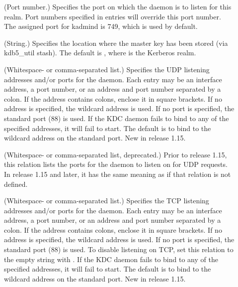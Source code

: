 \documentclass[letterpaper,10pt,english]{sphinxmanual}
\begin{document}
\begin{description}
\item[{}] \leavevmode
(Port number.)  Specifies the port on which the {\hyperref[\detokenize{admin/admin_commands/kadmind:kadmind-8}]{}}
daemon is to listen for this realm.  Port numbers specified in
 entries will override this port number.  The
assigned port for kadmind is 749, which is used by default.

\item[{}] \leavevmode
(String.)  Specifies the location where the master key has been
stored (via kdb5\_util stash).  The default is {\hyperref[\detokenize{mitK5defaults:paths}]{}}, where  is the Kerberos realm.

\item[{}] \leavevmode
(Whitespace- or comma-separated list.)  Specifies the UDP
listening addresses and/or ports for the {\hyperref[\detokenize{admin/admin_commands/krb5kdc:krb5kdc-8}]{}} daemon.
Each entry may be an interface address, a port number, or an
address and port number separated by a colon.  If the address
contains colons, enclose it in square brackets.  If no address is
specified, the wildcard address is used.  If no port is specified,
the standard port (88) is used.  If the KDC daemon fails to bind
to any of the specified addresses, it will fail to start.  The
default is to bind to the wildcard address on the standard port.
New in release 1.15.

\item[{}] \leavevmode
(Whitespace- or comma-separated list, deprecated.)  Prior to
release 1.15, this relation lists the ports for the
{\hyperref[\detokenize{admin/admin_commands/krb5kdc:krb5kdc-8}]{}} daemon to listen on for UDP requests.  In
release 1.15 and later, it has the same meaning as 
if that relation is not defined.

\item[{}] \leavevmode
(Whitespace- or comma-separated list.)  Specifies the TCP
listening addresses and/or ports for the {\hyperref[\detokenize{admin/admin_commands/krb5kdc:krb5kdc-8}]{}} daemon.
Each entry may be an interface address, a port number, or an
address and port number separated by a colon.  If the address
contains colons, enclose it in square brackets.  If no address is
specified, the wildcard address is used.  If no port is specified,
the standard port (88) is used.  To disable listening on TCP, set
this relation to the empty string with .
If the KDC daemon fails to bind to any of the specified addresses,
it will fail to start.  The default is to bind to the wildcard
address on the standard port.  New in release 1.15.


\end{description}
\end{document}
